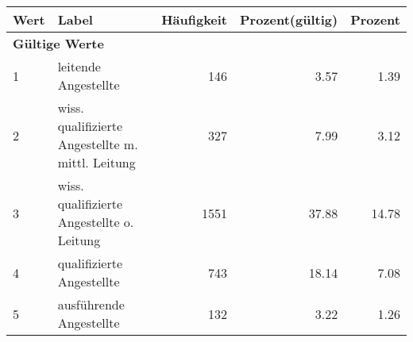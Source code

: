      \begin{longtable}{lXrrr}
     \toprule
     \textbf{Wert} & \textbf{Label} & \textbf{Häufigkeit} & \textbf{Prozent(gültig)} & \textbf{Prozent} \\
     \endhead
     \midrule
     \multicolumn{5}{l}{\textbf{Gültige Werte}}\\

     1 &
     \multicolumn{1}{X}{ leitende Angestellte   } &


       \num{146} &
       \num[round-mode=places,round-precision=2]{3.57} &
         \num[round-mode=places,round-precision=2]{1.39} \\

     2 &
     \multicolumn{1}{X}{ wiss. qualifizierte Angestellte m. mittl. Leitung   } &


       \num{327} &
       \num[round-mode=places,round-precision=2]{7.99} &
         \num[round-mode=places,round-precision=2]{3.12} \\

     3 &
     \multicolumn{1}{X}{ wiss. qualifizierte Angestellte o. Leitung   } &


       \num{1551} &
       \num[round-mode=places,round-precision=2]{37.88} &
         \num[round-mode=places,round-precision=2]{14.78} \\

     4 &
     \multicolumn{1}{X}{ qualifizierte Angestellte   } &


       \num{743} &
       \num[round-mode=places,round-precision=2]{18.14} &
         \num[round-mode=places,round-precision=2]{7.08} \\

     5 &
     \multicolumn{1}{X}{ ausführende Angestellte   } &


       \num{132} &
       \num[round-mode=places,round-precision=2]{3.22} &
         \num[round-mode=places,round-precision=2]{1.26} \\


\end{longtable}
